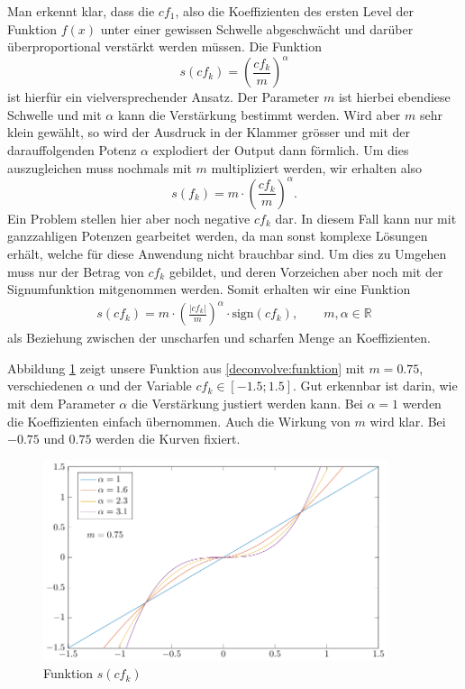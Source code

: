Man erkennt klar, dass die $cf_1$, also die Koeffizienten des ersten Level der Funktion $f(x)$ unter einer gewissen Schwelle abgeschwächt und darüber überproportional verstärkt werden müssen.
Die Funktion
$$s(cf_k) = \left( \frac{cf_k}{m}\right)^\alpha$$
ist hierfür ein vielversprechender Ansatz.
Der Parameter $m$ ist hierbei ebendiese Schwelle und mit $\alpha$ kann die Verstärkung bestimmt werden.
Wird aber $m$ sehr klein gewählt, so wird der Ausdruck in der Klammer grösser und mit der darauffolgenden Potenz $\alpha$ explodiert der Output dann förmlich.
Um dies auszugleichen muss nochmals mit $m$ multipliziert werden, wir erhalten also
$$s(f_k) = m\cdot \left( \frac{cf_k}{m}\right)^\alpha.$$
Ein Problem stellen hier aber noch negative $cf_k$ dar. In diesem Fall kann nur mit ganzzahligen Potenzen gearbeitet werden, da man sonst komplexe Lösungen erhält, welche für diese Anwendung nicht brauchbar sind.
Um dies zu Umgehen muss nur der Betrag von $cf_k$ gebildet, und deren Vorzeichen aber noch mit der Signumfunktion mitgenommen werden.
Somit erhalten wir eine Funktion
\begin{align}
s(cf_k)=m\cdot \left(\frac{|cf_k|}{m}\right)^{\alpha}\cdot \text{sign}(cf_k), \qquad m,\alpha\in\mathbb{R}
\label{deconvolve:funktion}
\end{align}
als Beziehung zwischen der \glqq unscharfen\grqq{} und \glqq scharfen\grqq{} Menge an Koeffizienten.

Abbildung \ref{deconvolve:function} zeigt unsere Funktion aus \eqref{deconvolve:funktion} mit $m=0.75$, verschiedenen $\alpha$ und der Variable $cf_k\in[-1.5;1.5]$.
Gut erkennbar ist darin, wie mit dem Parameter $\alpha$ die Verstärkung justiert werden kann.
Bei $\alpha = 1$ werden die Koeffizienten einfach übernommen.
Auch die Wirkung von $m$ wird klar.
Bei $-0.75$ und $0.75$ werden die Kurven fixiert.
\begin{figure}[h]
\centering
\includegraphics[width=0.9\textwidth]{./papers/deconvolve/pictures/function.pdf}
\caption{Funktion $s(cf_k)$\label{deconvolve:function}}
\end{figure}

